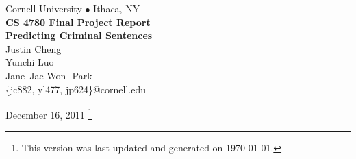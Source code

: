\documentclass[11pt,letter]{article}
\begin{document}
\begin{center}
    {\large \sc Cornell University $\bullet$ Ithaca, NY}
    \vspace{42mm}
    \\ {\huge \textbf {CS 4780 Final Project Report\vspace{8mm}\Huge\\Predicting Criminal Sentences}}
    \vspace{22mm}
    \normalsize
    \\ Justin Cheng
    \\ Yunchi Luo
    \\ Jane\,\,\,Jae Won\,\,\,\,Park
    \\ \{jc882, yl477, jp624\}@cornell.edu
    
    \vspace{8mm}
    
    \vspace{12mm}
    
    December 16, 2011
 \footnote{This version was last updated and generated on \today.}
\end{center}

\vspace{20mm}

\newpage
\tableofcontents
\newpage



\end{document}
